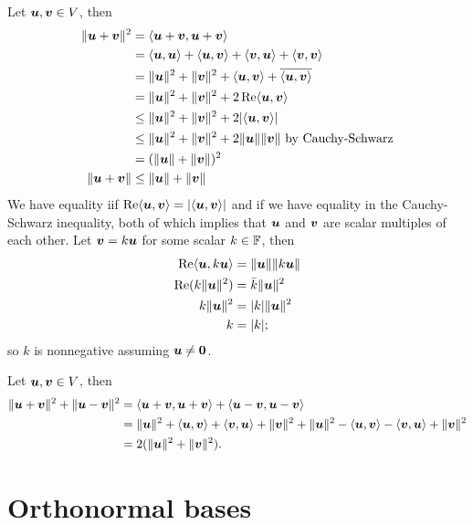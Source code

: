 \documentclass{report}
\DeclareMathOperator{\re}{Re}
\begin{document}
	\begin{myproof}
		Let $\boldsymbol{u},\boldsymbol{v}\in V$, then
		\begin{align*}
			\|\bmu+\bmv\|^2&=\lsp\bmu+\bmv,\bmu+\bmv\rsp\\
			&=\lsp\bmu,\bmu\rsp +\lsp\bmu,\bmv\rsp+\lsp\bmv,\bmu\rsp+\lsp\bmv,\bmv\rsp\\
			&=\|\bmu\|^2+\|\bmv\|^2+\lsp\bmu,\bmv\rsp+\overline{\lsp\bmu,\bmv\rsp}\\
			&=\|\bmu\|^2+\|\bmv\|^2+2\re\lsp\bmu,\bmv\rsp\\
			&\leq\|\bmu\|^2+\|\bmv\|^2+2|\lsp\bmu,\bmv\rsp|\\
			&\leq\|\bmu\|^2+\|\bmv\|^2+2\|\bmu\|\|\bmv\|\text{ by Cauchy-Schwarz}\\
			&=(\|\bmu\|+\|\bmv\|)^2\\
			\|\bmu+\bmv\|&\leq \|\bmu\|+\|\bmv\|\\
		\end{align*}
		We have equality iif $\re\lsp\bmu,\bmv\rsp=|\lsp\bmu,\bmv\rsp|$ and if we have equality in the Cauchy-Schwarz inequality, both of which implies that $\boldsymbol{u}$ and $\boldsymbol{v}$ are scalar multiples of each other. Let $\boldsymbol{v}=k\boldsymbol{u}$ for some scalar $k\in\FF$, then
		\begin{align*}
			\re\lsp\bmu,k\bmu\rsp&=\|\bmu\|\|k\bmu\|\\
			\re (k\|\bmu\|^2)&=\bar{k}\|\bmu\|^2\\
			k\|\bmu\|^2&=|k|\|\bmu\|^2\\
			k&=|k|;
		\end{align*}
		so $k$ is nonnegative assuming $\boldsymbol{u}\neq\textbf{0}$. 
	\end{myproof}
	\vspace{1mm}
	\begin{myproof}
		Let $\boldsymbol{u},\boldsymbol{v}\in V$, then
		\begin{align*}
			\|\boldsymbol{u}+\boldsymbol{v}\|^2+\|\boldsymbol{u}-\boldsymbol{v}\|^2&=\langle\boldsymbol{u}+\boldsymbol{v},\boldsymbol{u}+\boldsymbol{v}\rangle+\langle\boldsymbol{u}-\boldsymbol{v},\boldsymbol{u}-\boldsymbol{v}\rangle\\
			&=\|\boldsymbol{u}\|^2+\langle\boldsymbol{u},\boldsymbol{v}\rangle+\langle\boldsymbol{v},\boldsymbol{u}\rangle+\|\boldsymbol{v}\|^2+\|\boldsymbol{u}\|^2-\langle\boldsymbol{u},\boldsymbol{v}\rangle-\langle\boldsymbol{v},\boldsymbol{u}\rangle+\|\boldsymbol{v}\|^2\\
			&=2(\|\boldsymbol{u}\|^2+\|\boldsymbol{v}\|^2).
		\end{align*}
	\end{myproof}
	
	\section{Orthonormal bases}
\end{document}
